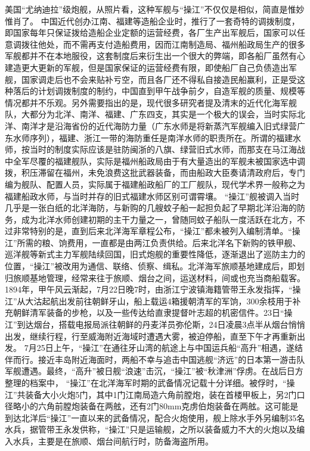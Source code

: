 \documentclass[12pt,UTF8]{ctexbook}
\begin{document}
美国“尤纳迪拉”级炮舰，从照片看，这种军舰与“操江”不仅仅是相似，简直是惟妙惟肖了。
中国近代创办江南、福建等造船企业时，推行了一套奇特的调拨制度，即国家每年只保证拨给造船企业定额的运营经费，各厂生产出军舰后，国家可以任意调拨往他处，而不需再支付造船费用，因而江南制造局、福州船政局生产的很多军舰都并不在本地服役，这套制度后来衍生出一个很大的弊端，即各船厂虽然有心建造更大更新的军舰，但是国家保证的运营经费有限，即使船厂自己负债造出军舰，国家调走后也不会来贴补亏空，而且各厂还不得私自接造民船赢利，正是受这种落后的计划调拨制度的制约，中国直到甲午战争前夕，自造军舰的质量、规模等情况都并不乐观。另外需要指出的是，现代很多研究者提及清末的近代化海军舰队，大都分为北洋、南洋、福建、广东四支，其实是一个极大的误会，当时实际北洋、南洋才是沿海省份的近代海防力量（广东水师是将新蒸汽军舰编入旧式绿营广东水师序列），福建、浙江一带的海防重任是南洋水师的职责所在。所谓的福建水师，按当时的制度实际应该是驻防闽浙的八旗、绿营旧式水师，而那支在马江海战中全军尽覆的福建舰队，实际是福州船政局由于有大量造出的军舰未被国家选中调拨，积压滞留在福州，未免浪费这批武器装备，而由船政大臣奏请清政府后，专门编为舰队、配置人员，实际属于福建船政船厂的工厂舰队，现代学术界一般称之为福建船政水师，与当时并存的旧式福建水师区别可谓霄壤。
“操江”舰被调入当时几乎是一张白纸的北洋海防，与新购的几艘蚊子船一起担负起了早期北洋沿海的防务，成为北洋水师创建初期的主干力量之一，曾随同蚊子船队一度活跃在北方，不过非常特别的是，直到后来北洋海军章程公布，“操江”都未被列入编制清单。“操江”所需的粮、饷费用，一直都是由两江负责供给。后来北洋名下新购的铁甲舰、巡洋舰等新式主力军舰陆续回国，旧式炮舰的重要性降低，逐渐退出了巡防主力的位置，“操江”被改用为通信、联络、侦察、缉私。北洋海军旅顺基地建成后，即划归旅顺基地管理，经常来往于旅顺、烟台之间，运送材料，间或也充当商船载客。
1894年，甲午风云渐起，7月22日晚7时，由浙江宁波镇海籍管带王永发指挥，“操江”从大沽起航出发前往朝鲜牙山，船上载运4箱援朝清军的军饷，300余枝用于补充朝鲜清军装备的步枪，以及一些传达给直隶提督叶志超的机密信件。23日“操江”到达烟台，搭载电报局派往朝鲜的丹麦洋员弥伦斯，24日凌晨3点半从烟台悄悄出发，继续行程，行至威海附近海域时遭遇大雾，被迫停船，直至下午才再重新出发。
7月25日上午，“操江”在通往牙山湾的航途上与中国运兵船“高升”相遇，遂结伴而行。接近丰岛附近海面时，两船不幸与追击中国逃舰“济远”的日本第一游击队军舰遭遇。最终，“高升”被日舰“浪速”击沉，“操江”被“秋津洲”俘虏。在战后日方整理的档案中， “操江”在北洋海军时期的武备情况记载十分详细。被俘时，“操江”共装备大小火炮5门，其中1门江南局造六角前膛炮，装在首楼甲板上，另2门口径略小的六角前膛炮装备在两舷，还有2门80mm克虏伯炮装备在两舷。这可能是到达北洋后“操江”一直以来的武备情况，配合火炮使用，舰上除水手外另编制35名水兵，据管带王永发供称，“操江”只是运输舰，之所以装备威力不大的火炮以及编入水兵，主要是在旅顺、烟台间航行时，防备海盗所用。
\end{document}
